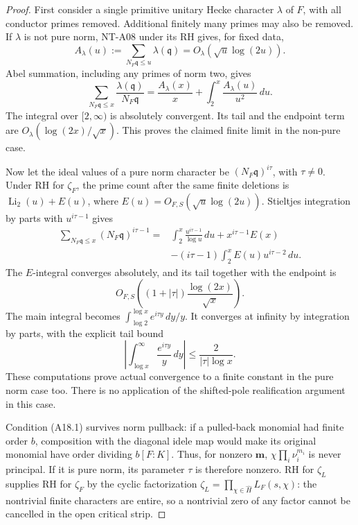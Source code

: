 \begin{proof}
First consider a single primitive unitary Hecke
character \(\lambda\) of \(F\), with all conductor
primes removed. Additional finitely many primes
may also be removed. If \(\lambda\) is not pure norm,
NT-A08 under its RH gives, for fixed data,
\[
 A_\lambda(u):=\sum_{N_F\mathfrak q\le u}\lambda(\mathfrak q)
                        =O_\lambda(\sqrt u\log(2u)).
 \]
Abel summation, including any primes of norm two,
gives
\[
 \sum_{N_F\mathfrak q\le x}
            \frac{\lambda(\mathfrak q)}{N_F\mathfrak q}
   =\frac{A_\lambda(x)}x+
                         \int_2^x\frac{A_\lambda(u)}{u^2}\,du .
 \]
The integral over \([2,\infty)\) is absolutely
convergent. Its tail and the endpoint term are
\(O_\lambda(\log(2x)/\sqrt x)\). This proves the
claimed finite limit in the non-pure case.

Now let the ideal values of a pure norm character
be \((N_F\mathfrak q)^{i\tau}\), with \(\tau\ne0\).
Under RH for \(\zeta_F\), the prime count after the
same finite deletions is
\(\operatorname{Li}_2(u)+E(u)\), where
\(E(u)=O_{F,S}(\sqrt u\log(2u))\).
Stieltjes integration by parts with
\(u^{i\tau-1}\) gives
\[
 \begin{split}
 \sum_{N_F\mathfrak q\le x}(N_F\mathfrak q)^{i\tau-1}
  ={}&\int_2^x\frac{u^{i\tau-1}}{\log u}\,du
       +x^{i\tau-1}E(x)\\
    &-(i\tau-1)\int_2^x E(u)u^{i\tau-2}\,du .
 \end{split}                                                   \tag{A18.6}
\]
The \(E\)-integral converges absolutely, and its
tail together with the endpoint is
\[
        O_{F,S}\left((1+|\tau|)
                               \frac{\log(2x)}{\sqrt x}\right).
 \]
The main integral becomes
\(\int_{\log2}^{\log x}e^{i\tau y}\,dy/y\).
It converges at infinity by integration by parts,
with the explicit tail bound
\[
       \left|\int_{\log x}^\infty
                      \frac{e^{i\tau y}}y\,dy\right|
                         \le\frac2{|\tau|\log x}.         \tag{A18.7}
\]
These computations prove actual convergence to a
finite constant in the pure norm case too.
There is no application of the shifted-pole
realification argument in this case.

Condition (A18.1) survives norm pullback:
if a pulled-back monomial had finite order \(b\),
composition with the diagonal idele map would
make its original monomial have order dividing
\(b[F:K]\). Thus, for nonzero \(\mathbf m\),
\(\chi\prod_i\nu_i^{m_i}\) is never principal.
If it is pure norm, its parameter \(\tau\) is
therefore nonzero. RH for \(\zeta_L\) supplies
RH for \(\zeta_F\) by the cyclic factorization
\(\zeta_L=\prod_{\chi\in\widehat H}L_F(s,\chi)\):
the nontrivial finite characters are entire, so
a nontrivial zero of any factor cannot be
cancelled in the open critical strip.


\end{proof}
